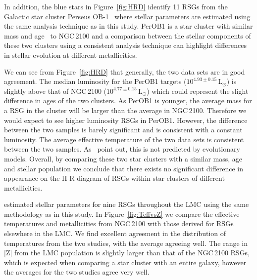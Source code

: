 \documentclass[useAMS,usenatbib]{mn2e}
\begin{document}
In addition, the blue stars in Figure~\ref{fig:HRD} identify 11 RSGs from the Galactic star cluster Perseus OB-1~\citep[PerOB1;][]{2014ApJ...787..142G} where stellar parameters are estimated using the same analysis technique as in this study.
PerOB1 is a star cluster with similar mass and age~\citep[$2\times10^{4}\,$M$_{\odot}$ and 14\,Myr respectively;][]{2010ApJS..186..191C} to NGC\,2100 and a comparison between the stellar components of these two clusters using a consistent analysis technique can highlight differences in stellar evolution at different metallicities.

We can see from Figure~\ref{fig:HRD} that generally, the two data sets are in good agreement.
The median luminosity for the PerOB1 targets ($10^{4.93\pm0.15}\,$L$_{\odot}$) is slightly above that of NGC\,2100 ($10^{4.77\pm0.15}\,$L$_{\odot}$) which could represent the slight difference in ages of the two clusters.
As PerOB1 is younger, the average mass for a RSG in the cluster will be larger than the average in NGC\,2100.
Therefore we would expect to see higher luminosity RSGs in PerOB1.
However, the difference between the two samples is barely significant and is consistent with a constant luminosity.
The average effective temperature of the two data sets is consistent between the two samples.
As~\cite{2015ApJ...803...14P} point out, this is not predicted by evolutionary models.
Overall, by comparing these two star clusters with a similar mass, age and stellar population we conclude that there exists no significant difference in appearance on the H-R diagram of RSGs within star clusters of different metallicities.


\citet{2015ApJ...806...21D} estimated stellar parameters for nine RSGs throughout the LMC using the same methodology as in this study.
In Figure~\ref{fig:TeffvsZ} we compare the effective temperatures and metallicities from NGC\,2100 with those derived for RSGs elsewhere in the LMC.
We find excellent agreement in the distribution of temperatures from the two studies, with the average agreeing well.
The range in [Z] from the LMC population is slightly larger than that of the NGC\,2100 RSGs, which is expected when comparing a star cluster with an entire galaxy, however the averages for the two studies agree very well.
\end{document}
